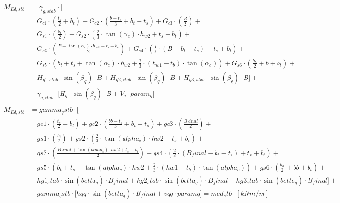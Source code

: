 \documentclass[a4paper, 11pt]{article}
\begin{document}
\begin{align*}
M_{Ed,stb} &= \gamma_{g,stab} \cdot \bigg[ \\
		   &\quad G_{c1} \cdot \left( \frac{t_{s}}{2} + b_{t} \right) + G_{c2} \cdot \left( \frac{b - t_{s}}{3} + b_{t} + t_{s} \right) + G_{c3} \cdot \left( \frac{B}{2} \right) + \\
		   &\quad G_{s1} \cdot \left( \frac{b_{t}}{2} \right) + G_{s2} \cdot \left( \frac{2}{3} \cdot \tan(\alpha_{c}) \cdot h_{w2} + t_{s} + b_{t} \right) + \\
		   &\quad G_{s3} \cdot \left( \frac{B + \tan(\alpha_{c}) \cdot h_{w2} + t_{s} + b_{t}}{2} \right) + G_{s4} \cdot \left( \frac{2}{3} \cdot (B - b_{t} - t_{s}) + t_{s} + b_{t} \right) + \\
		   &\quad G_{s5} \cdot \left( b_{t} + t_{s} + \tan(\alpha_{c}) \cdot h_{w2} + \frac{2}{3} \cdot (h_{w1} - t_{b}) \cdot \tan(\alpha_{c})\right) + G_{s6} \cdot \left( \frac{b_{h}}{2} + b + b_{t} \right) + \\
		   &\quad H_{g1,stab} \cdot \sin(\beta_{q}) \cdot B + H_{g2,stab} \cdot \sin(\beta_{q}) \cdot B + H_{g3,stab} \cdot \sin(\beta_{q}) \cdot B \bigg] + \\
		   &\quad \gamma_{q,stab} \cdot \bigg[ H_{q} \cdot \sin(\beta_{q}) \cdot B + V_{q} \cdot param_{q} \bigg] \\
\end{align*} 
\begin{align*}
M_{Ed,stb} &= gamma_gstb \cdot \bigg[ \\
		   &\quad gc1 \cdot \left( \frac{t_s}{2} + b_t \right) + gc2 \cdot \left( \frac{bb - t_s}{3} + b_t + t_s \right) + gc3 \cdot \left( \frac{B_final}{2} \right) + \\
		   &\quad gs1 \cdot \left( \frac{b_t}{2} \right) + gs2 \cdot \left( \frac{2}{3} \cdot \tan(alpha_c) \cdot hw2 + t_s + b_t \right) + \\
		   &\quad gs3 \cdot \left( \frac{B_final + \tan(alpha_c) \cdot hw2 + t_s + b_t}{2} \right) + gs4 \cdot \left( \frac{2}{3} \cdot (B_final - b_t - t_s) + t_s + b_t \right) + \\
		   &\quad gs5 \cdot \left( b_t + t_s + \tan(alpha_c) \cdot hw2 + \frac{2}{3} \cdot (hw1 - t_b) \cdot \tan(alpha_c)\right) + gs6 \cdot \left( \frac{b_h}{2} + bb + b_t \right) + \\
		   &\quad hg1_stab \cdot \sin(betta_q) \cdot B_final + hg2_stab \cdot \sin(betta_q) \cdot B_final + hg3_stab \cdot \sin(betta_q) \cdot B_final \bigg] + \\
		   &\quad gamma_qstb \cdot \bigg[ hqq \cdot \sin(betta_q) \cdot B_final + vqq \cdot paramq \bigg] = med_stb \text{ } [kNm/m] \\	   
\end{align*}
\end{document}
